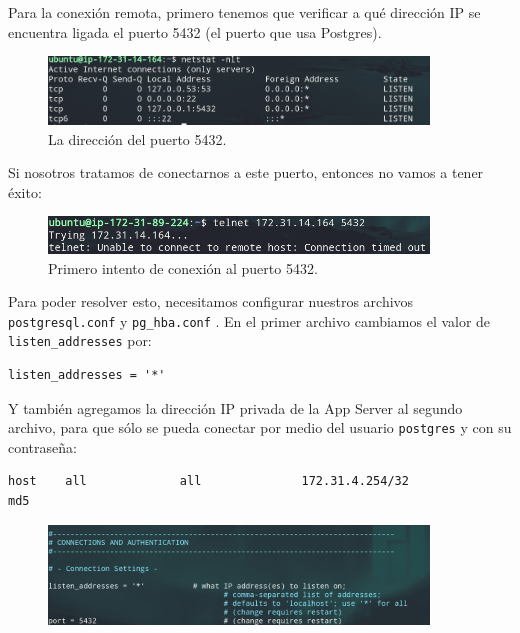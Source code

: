 \documentclass{article}
\newcommand{\ttt}[1]{%
\texttt{#1}%
}
\begin{document}
Para la conexión remota, primero tenemos que verificar a qué
dirección IP se encuentra ligada el puerto 5432 (el puerto
que usa Postgres).

\begin{figure}[H]
  \centering
  \includegraphics[width=0.9\textwidth]{DATASERVER/exhibitF}
  \caption{La dirección del puerto 5432.}
  \label{fig:DATASERVER-E}
\end{figure}

Si nosotros tratamos de conectarnos a este puerto, entonces no
vamos a tener éxito:

\begin{figure}[H]
  \centering
  \includegraphics[width=0.9\textwidth]{DATASERVER/exhibitG}
  \caption{Primero intento de conexión al puerto 5432.}
  \label{fig:DATASERVER-G}
\end{figure}

Para poder resolver esto, necesitamos configurar nuestros
archivos \ttt{postgresql.conf} y \ttt{pg\_hba.conf}.
En el primer archivo cambiamos el valor de
\ttt{listen\_addresses} por:

\begin{lstlisting}
listen_addresses = '*'
\end{lstlisting}

Y también agregamos la dirección IP privada de la App
Server  al segundo archivo, para que sólo se pueda conectar
por medio del usuario \ttt{postgres} y con su contraseña:
\begin{lstlisting}
host    all             all              172.31.4.254/32                       md5
\end{lstlisting}

\begin{figure}[H]
  \centering
  \includegraphics[width=0.9\textwidth]{DATASERVER/exhibitI}
  \label{fig:DATASERVER-I}
\end{figure}
\end{document}
